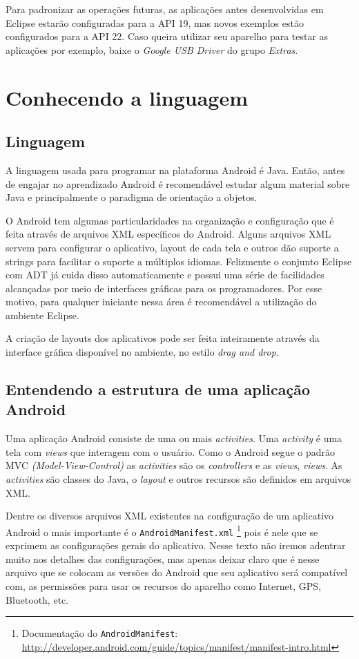 \documentclass[a4paper,12pt,brazil,oneside]{book}
\begin{document}
Para padronizar as operações futuras, as aplicações antes desenvolvidas em Eclipse estarão configuradas para a API 19, mas novos exemplos estão configurados para a API 22. Caso queira utilizar seu aparelho para testar as aplicações por exemplo, baixe o \emph{Google USB Driver} do grupo \emph{Extras}.

\chapter{Conhecendo a linguagem}
\section{Linguagem}
A linguagem usada para programar na plataforma Android é Java. Então, antes de engajar no aprendizado Android é recomendável estudar algum material sobre Java e principalmente o paradigma de orientação a objetos.

O Android tem algumas particularidades na organização e configuração que é feita através de arquivos XML específicos do Android. Alguns arquivos XML servem para configurar o aplicativo, layout de cada tela e outros dão suporte a strings para facilitar o suporte a múltiplos idiomas. Felizmente o conjunto Eclipse com ADT já cuida disso automaticamente e possui uma série de facilidades alcançadas por meio de interfaces gráficas para os programadores. Por esse motivo, para qualquer iniciante nessa área é recomendável a utilização do ambiente Eclipse.

A criação de layouts dos aplicativos pode ser feita inteiramente através da interface gráfica disponível no ambiente, no estilo \textit{drag and drop}. 

\section{Entendendo a estrutura de uma aplicação Android}

Uma aplicação Android consiste de uma ou mais \emph{activities}. Uma \emph{activity} é uma tela com \emph{views} que interagem com o usuário. Como o Android segue o padrão MVC \emph{(Model-View-Control)} as \emph{activities} são os \emph{controllers} e as \emph{views}, \emph{views}. As \emph{activities} são classes do Java, o \emph{layout} e outros recursos são definidos em arquivos XML.

Dentre os diversos arquivos XML existentes na configuração de um aplicativo Android o mais importante é o \texttt{{AndroidManifest.xml}}
\footnote{Documentação do \texttt{AndroidManifest}: \href{The AndroidManifest.xml File}{http://developer.android.com/guide/topics/manifest/manifest-intro.html}}
 pois é nele que se exprimem as configurações gerais do aplicativo. Nesse texto não iremos adentrar muito nos detalhes das configurações, mas apenas deixar claro que é nesse arquivo que se colocam as versões do Android que seu aplicativo será compatível com, as permissões para usar os recursos do aparelho como Internet, GPS, Bluetooth, etc. 
 
\end{document}
